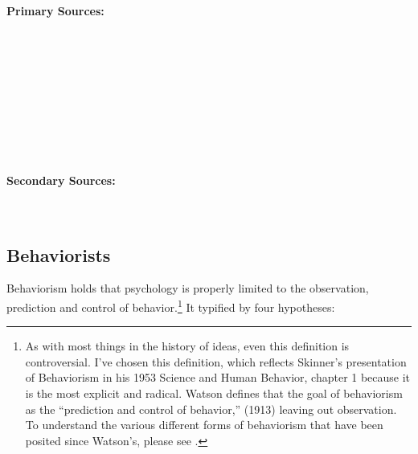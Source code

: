 \begin{refsection}
\paragraph{Primary Sources:}
\label{primarysources:}

~\citep{Freud:QdOvAgyZ}

~\citep{Freud:vJ1P2PRd}

~\citep{Freud:1994wo}

~\citep{Jung:cpLzoBjv}

~\citep{Jung:1953uoa}

\paragraph{Secondary Sources:}
\label{secondarysources:}

~\citep{Arieti:1974tm}

\subsection{Behaviorists}
\label{behaviorists}

Behaviorism holds that psychology is properly limited to the observation, prediction and control of behavior.\footnote{As with most things in the history of ideas, even this definition is controversial. I've chosen this definition, which reflects Skinner's presentation of Behaviorism in his 1953 Science and Human Behavior, chapter 1 because it is the most explicit and radical. Watson defines that the goal of behaviorism as the “prediction and control of behavior,” (1913) leaving out observation. To understand the various different forms of behaviorism that have been posited since Watson's, please see .} It typified by four hypotheses:


\end{refsection}
